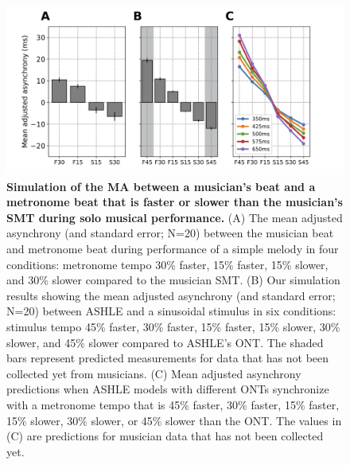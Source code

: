 \documentclass{report}
\begin{document}
\begin{figure}
    \centering
    \includegraphics[width=1.0\textwidth]{figures/fig3_2.png}
    \caption[Simulation of the MA between a musician's beat and a metronome beat that is faster or slower than the musician's SMT during solo musical performance]{\textbf{Simulation of the MA between a musician's beat and a metronome beat that is faster or slower than the musician's SMT during solo musical performance.} (A) The mean adjusted asynchrony (and standard error; N=20) between the musician beat and metronome beat during performance of a simple melody in four conditions: metronome tempo 30\% faster, 15\% faster, 15\% slower, and 30\% slower compared to the musician SMT. (B) Our simulation results showing the mean adjusted asynchrony (and standard error; N=20) between ASHLE and a sinusoidal stimulus in six conditions: stimulus tempo 45\% faster, 30\% faster, 15\% faster, 15\% slower, 30\% slower, and 45\% slower compared to ASHLE's ONT. The shaded bars represent predicted measurements for data that has not been collected yet from musicians. (C) Mean adjusted asynchrony predictions when ASHLE models with different ONTs synchronize with a metronome tempo that is 45\% faster, 30\% faster, 15\% faster, 15\% slower, 30\% slower, or 45\% slower than the ONT. The values in (C) are predictions for musician data that has not been collected yet.}
    \label{f3_2}
\end{figure}
\end{document}
